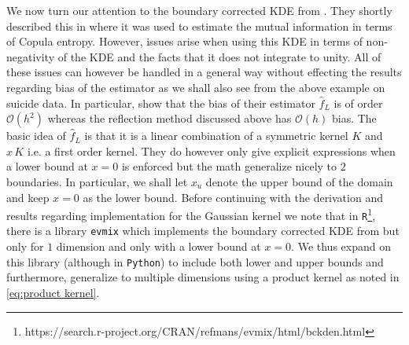 \documentclass[../Thesis.tex]{subfiles}
\begin{document}
We now turn our attention to the boundary corrected KDE from \cite{Jones1993SimpleBC}. They shortly described this in \cite{Nonparametric-copula-entropy-and-network-deconvolution-method-for-causal-discovery-in-complex-manufacturing-systems} where it was used to estimate the mutual information in terms of Copula entropy. However, issues arise when using this KDE in terms of non-negativity of the KDE and the facts that it does not integrate to unity. All of these issues can however be handled in a general way without effecting the results regarding bias of the estimator as we shall also see from the above example on suicide data. In particular, \cite{Jones1993SimpleBC} show that the bias of their estimator $\hat{f}_L$ is of order $\mathcal{O}\left(h^2\right)$ whereas the reflection method discussed above has $\mathcal{O}\left(h\right)$ bias. The basic idea of $\hat{f}_L$ is that it is a linear combination of a symmetric kernel $K$ and $x \, K$ i.e. a first order kernel. They do however only give explicit expressions when a lower bound at $x = 0$ is enforced but the math generalize nicely to $2$ boundaries. In particular, we shall let $x_u$ denote the upper bound of the domain and keep $x= 0$ as the lower bound. Before continuing with the derivation and results regarding implementation for the Gaussian kernel we note that in \texttt{R}\footnote{https://search.r-project.org/CRAN/refmans/evmix/html/bckden.html}, there is a library \texttt{evmix} which implements the boundary corrected KDE from \cite{Jones1993SimpleBC} but only for $1$ dimension and only with a lower bound at $x=0$. We thus expand on this library (although in \texttt{Python}) to include both lower and upper bounds and furthermore, generalize to multiple dimensions using a product kernel as noted in \autoref{eq:product kernel}.
\end{document}
